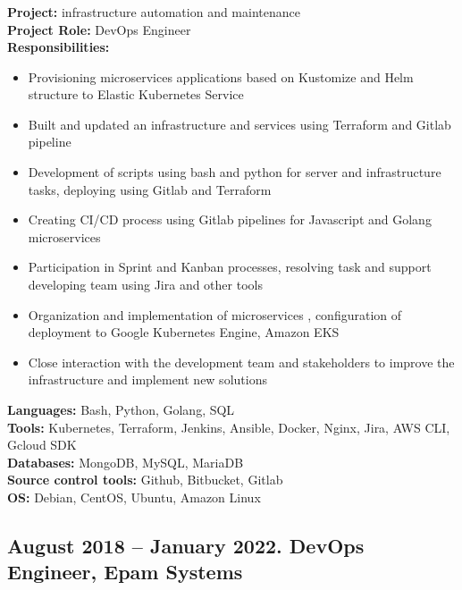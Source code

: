 \documentclass[letterpaper]{article}
\begin{document}
\subsubsection{}
\label{sec-2-1-1}
\textbf{Project:} infrastructure automation and maintenance\\
\textbf{Project Role:}  DevOps Engineer\\
\textbf{Responsibilities:}\\
\begin{itemize}
	\item Provisioning microservices applications based on Kustomize and Helm structure to Elastic Kubernetes Service
	\item Built and updated an infrastructure and services using Terraform and Gitlab pipeline
	\item Development of scripts using bash and python for server and infrastructure tasks, deploying using Gitlab and Terraform
	\item Creating CI/CD process using Gitlab pipelines for Javascript and Golang microservices
	\item Participation in Sprint and Kanban processes, resolving task and support developing team using Jira and other tools
	\item Organization and implementation of microservices , configuration of deployment to Google Kubernetes Engine, Amazon EKS
	\item Close interaction with the development team and stakeholders to improve the infrastructure and implement new solutions
\end{itemize}
\textbf{Languages:} Bash, Python, Golang, SQL\\
\textbf{Tools:} Kubernetes, Terraform, Jenkins, Ansible, Docker, Nginx, Jira, AWS CLI, Gcloud SDK \\
\textbf{Databases:} MongoDB, MySQL, MariaDB\\
\textbf{Source control tools:} Github, Bitbucket, Gitlab\\
\textbf{OS:} Debian, CentOS, Ubuntu, Amazon Linux \\
\subsection{{August 2018 – January 2022}. DevOps Engineer, Epam Systems}
\label{sec-2-1}
\end{document}
